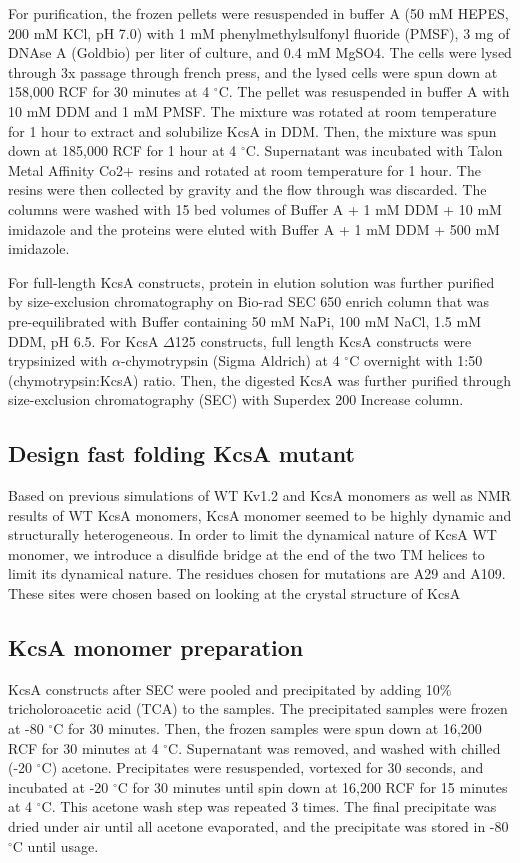 For purification, the frozen pellets were resuspended in buffer A (50 mM HEPES, 200 mM KCl, pH 7.0) with 1 mM phenylmethylsulfonyl fluoride (PMSF), 3 mg of DNAse A (Goldbio) per liter of culture, and 0.4 mM MgSO4. The cells were lysed through 3x passage through french press, and the lysed cells were spun down at 158,000 RCF for 30 minutes at 4 $^{\circ}$C. The pellet was resuspended in buffer A with 10 mM DDM and 1 mM PMSF. The mixture was rotated at room temperature for 1 hour to extract and solubilize KcsA in DDM. Then, the mixture was spun down at 185,000 RCF for 1 hour at 4 $^{\circ}$C. Supernatant was incubated with Talon Metal Affinity Co2+ resins and rotated at room temperature for 1 hour. The resins were then collected by gravity and the flow through was discarded. The columns were washed with 15 bed volumes of Buffer A + 1 mM DDM + 10 mM imidazole and the proteins were eluted with Buffer A + 1 mM DDM + 500 mM imidazole.

For full-length KcsA constructs, protein in elution solution was further purified by size-exclusion chromatography on Bio-rad SEC 650 enrich column that was pre-equilibrated with Buffer containing 50 mM NaPi, 100 mM NaCl, 1.5 mM DDM, pH 6.5. For KcsA $\Delta$125 constructs, full length KcsA constructs were trypsinized with $\alpha$-chymotrypsin (Sigma Aldrich) at 4 $^{\circ}$C overnight with 1:50 (chymotrypsin:KcsA) ratio. Then, the digested KcsA was further purified through size-exclusion chromatography (SEC) with Superdex 200 Increase column. 

\subsection{Design fast folding KcsA mutant}
Based on previous simulations of WT Kv1.2 and KcsA monomers as well as NMR results of WT KcsA monomers, KcsA monomer seemed to be highly dynamic and structurally heterogeneous. In order to limit the dynamical nature of KcsA WT monomer, we introduce a disulfide bridge at the end of the two TM helices to limit its dynamical nature. The residues chosen for mutations are A29 and A109. These sites were chosen based on looking at the crystal structure of KcsA

\subsection{KcsA monomer preparation}
KcsA constructs after SEC were pooled and precipitated by adding 10\% tricholoroacetic acid (TCA) to the samples. The precipitated samples were frozen at -80 $^{\circ}$C for 30 minutes. Then, the frozen samples were spun down at 16,200 RCF for 30 minutes at 4 $^{\circ}$C. Supernatant was removed, and washed with chilled (-20 $^{\circ}$C) acetone. Precipitates were resuspended, vortexed for 30 seconds, and incubated at -20 $^{\circ}$C for 30 minutes until spin down at 16,200 RCF for 15 minutes at 4 $^{\circ}$C. This acetone wash step was repeated 3 times. The final precipitate was dried under air until all acetone evaporated, and the precipitate was stored in -80 $^{\circ}$C until usage.

